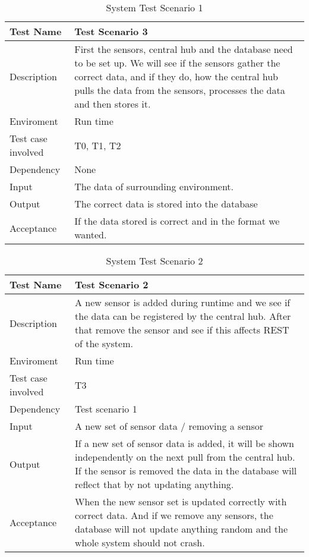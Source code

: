 \documentclass[../document]{subfiles}
\begin{document}
\begin{table}[H]
\caption{System Test Scenario 1}
\centering
\begin{tabularx}{\textwidth}{|l|X|}
	\hline
	Test Name
	&Test Scenario 3
	\\ \hline Description
	&First the sensors, central hub and the database need to be set up. We will see if the sensors gather the correct data, and if they do, how the central hub pulls the data from the sensors, processes the data and then stores it.
	\\ \hline Enviroment
	&Run time
	\\ \hline Test case involved
	&T0, T1, T2
	\\ \hline Dependency
	&None
	\\ \hline Input
	&The data of surrounding environment.
	\\ \hline Output
	&The correct data is stored into the database
	\\ \hline Acceptance
	&If the data stored is correct and in the format we wanted.		
	\\ \hline 
\end{tabularx}
\end{table}

\begin{table}[H]
\caption{System Test Scenario 2}
\centering
\begin{tabularx}{\textwidth}{|l|X|}
	\hline
	Test Name
	&Test Scenario 2
	\\ \hline Description
	&A new sensor is added during runtime and we see if the data can be registered by the central hub. After that remove the sensor and see if this affects \gls{REST} of the system. 
	\\ \hline Enviroment
	&Run time
	\\ \hline Test case involved
	&T3
	\\ \hline Dependency
	&Test scenario 1
	\\ \hline Input
	&A new set of sensor data / removing a sensor
	\\ \hline Output
	&If a new set of sensor data is added, it will be shown independently on the next pull from the central hub. If the sensor is removed the data in the database will reflect that by not updating anything.
	\\ \hline Acceptance
	&When the new sensor set is updated correctly with correct data. And if we remove any sensors, the database will not update anything random and the whole system should not crash.
	\\ \hline 
\end{tabularx}
\end{table}
\end{document}

